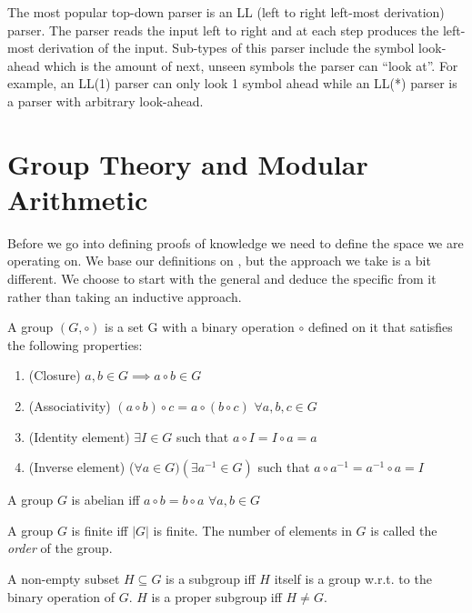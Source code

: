The most popular top-down parser is an LL (left to right left-most
derivation) parser. The parser reads the input left to right and at
each step produces the left-most derivation of the input. Sub-types of
this parser include the symbol look-ahead which is the amount of next,
unseen symbols the parser can ``look at''. For example, an LL(1)
parser can only look 1 symbol ahead while an LL(*) parser is a parser
with arbitrary look-ahead.

\section{Group Theory and Modular Arithmetic}

Before we go into defining proofs of knowledge we need to define the
space we are operating on. We base our definitions on \cite{HAC}, but
the approach we take is a bit different. We choose to start with the
general and deduce the specific from it rather than taking an
inductive approach.

\begin{defn}[Group]
  A group $(G, \circ)$ is a set G with a binary operation $\circ$ defined on it
  that satisfies the following properties:
  \begin{enumerate}
  \item (Closure) $a, b \in G \implies a \circ b \in G$ 
  \item (Associativity) $(a \circ b) \circ c = a \circ (b \circ c)$ $\forall a,b,c \in G$
  \item (Identity element) $\exists I \in G$ such that $a \circ I = I \circ a = a$
  \item (Inverse element) ($\forall a \in G)(\exists a^{-1} \in G)$ such that $a \circ
    a^{-1} = a^{-1} \circ a = I$
  \end{enumerate}
\end{defn}

\begin{defn}
  A group $G$ is abelian iff $a \circ b = b \circ a$ $\forall a,b \in G$
\end{defn}

\begin{defn}
  A group $G$ is finite iff $|G|$ is finite. The number of elements in
  $G$ is called the \emph{order} of the group.
\end{defn}

\begin{defn}[Subgroup]
  A non-empty subset $H \subseteq G$ is a subgroup iff $H$ itself is a
  group w.r.t. to the binary operation of $G$. $H$ is a proper subgroup
  iff $H \neq G$.
\end{defn}

